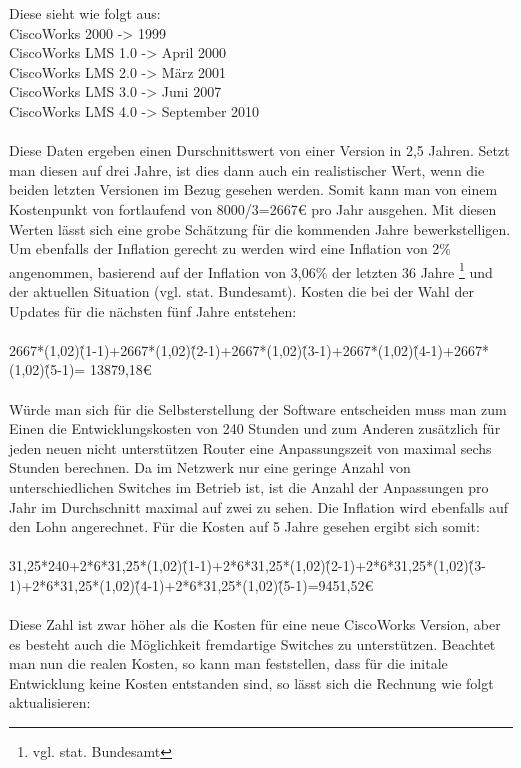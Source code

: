 Diese sieht wie folgt aus:
\\
CiscoWorks 2000 -> 1999\\
CiscoWorks LMS 1.0 -> April 2000\\
CiscoWorks LMS 2.0 -> März 2001 \\
CiscoWorks LMS 3.0 -> Juni 2007\\
CiscoWorks LMS 4.0 -> September 2010\\
\\
Diese Daten ergeben einen Durschnittswert von einer Version in 2,5 Jahren.
Setzt man diesen auf drei Jahre, ist dies dann auch ein realistischer Wert, wenn die beiden letzten Versionen im Bezug gesehen werden. Somit kann man von einem Kostenpunkt von fortlaufend von 8000/3=2667€ pro Jahr ausgehen. Mit diesen Werten lässt sich eine grobe Schätzung für die kommenden Jahre bewerkstelligen.
Um ebenfalls der Inflation gerecht zu werden wird eine Inflation von 2\% angenommen, basierend auf der Inflation von 3,06\% der letzten 36 Jahre \footnote{vgl. stat. Bundesamt} und der aktuellen Situation (vgl. stat. Bundesamt).
Kosten die bei der Wahl der Updates für die nächsten fünf Jahre entstehen:\\
\\
2667*(1,02)\^(1-1)+2667*(1,02)\^(2-1)+2667*(1,02)\^(3-1)+2667*(1,02)\^(4-1)+2667*(1,02)\^(5-1)=
13879,18€\\
\\
Würde man sich für die Selbsterstellung der Software entscheiden muss man zum Einen die Entwicklungskosten von 240 Stunden und zum Anderen zusätzlich für jeden neuen nicht unterstützen Router eine Anpassungszeit von maximal sechs Stunden berechnen.
Da im Netzwerk nur eine geringe Anzahl von unterschiedlichen Switches im Betrieb ist, ist die Anzahl der Anpassungen pro Jahr im Durchschnitt maximal auf zwei zu sehen.
Die Inflation wird ebenfalls auf den Lohn angerechnet. Für die Kosten auf 5 Jahre gesehen ergibt sich somit:\\
\\
31,25*240+2*6*31,25*(1,02)\^(1-1)+2*6*31,25*(1,02)\^(2-1)+2*6*31,25*(1,02)\^(3-1)+2*6*31,25*(1,02)\^(4-1)+2*6*31,25*(1,02)\^(5-1)=9451,52€\\
\\
Diese Zahl ist zwar höher als die Kosten für eine neue CiscoWorks Version, aber es besteht auch die Möglichkeit fremdartige Switches zu unterstützen.
Beachtet man nun die realen Kosten, so kann man feststellen, dass für die initale Entwicklung keine Kosten entstanden sind, so lässt sich die Rechnung wie folgt aktualisieren:\\
